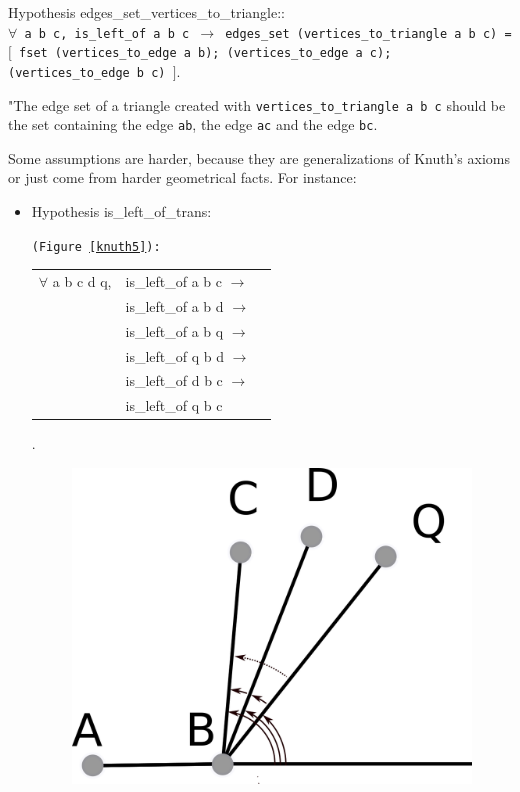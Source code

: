 \documentclass[a4paper,10pt]{article}
\def\hypothesis#1#2{{\color{purple}Hypothesis} {\color{blue}#1}: {\tt #2}}
\begin{document}
\hypothesis{edges\_set\_vertices\_to\_triangle:}
  {\\$\forall$ a b c, is\_left\_of a b c $\rightarrow$
    edges\_set (vertices\_to\_triangle a b c) =\\ 
                       $[$ fset (vertices\_to\_edge a b);
                           (vertices\_to\_edge a c);
                           (vertices\_to\_edge b c) $]$}.

                         "The edge set of a triangle created with {\tt vertices\_to\_triangle a b c} should be the set containing the edge {\tt ab}, the edge {\tt ac} and the edge {\tt bc}.
                         
Some assumptions are harder, because they are generalizations of Knuth's axioms or just come from harder geometrical facts. For instance:
\begin{itemize}
\item \hypothesis{is\_left\_of\_trans}{(Figure \ref{knuth5}):\\  \begin{tabular}{lll}
                                          $\forall$ a b c d q, &is\_left\_of a b c $\rightarrow$\\
                                           &is\_left\_of a b d $\rightarrow$\\
                                           &is\_left\_of a b q $\rightarrow$\\
                                           &is\_left\_of q b d $\rightarrow$\\
                                           &is\_left\_of d b c $\rightarrow$\\
                                           &is\_left\_of q b c 
           \end{tabular} }.
\\
\begin{figure}
\centering
\includegraphics[scale=2]{Axiom5}

\end{figure}
\end{itemize}
\end{document}
